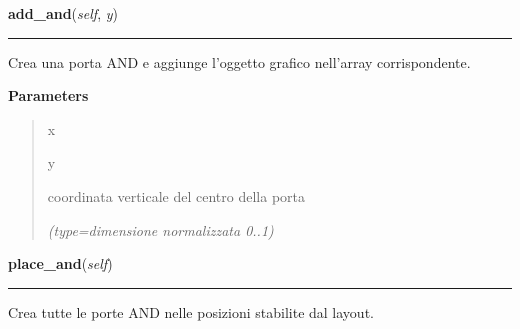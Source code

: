 \hspace{.8\funcindent}\begin{boxedminipage}{\funcwidth}

    \raggedright \textbf{add\_and}(\textit{self}, \textit{y})

    \vspace{-1.5ex}

    \rule{\textwidth}{0.5\fboxrule}
\setlength{\parskip}{2ex}
    Crea una porta AND e aggiunge l'oggetto grafico nell'array 
    corrispondente.

\setlength{\parskip}{1ex}
      \textbf{Parameters}
      \vspace{-1ex}

      \begin{quote}
        \begin{Ventry}{x}

          \item[y]

          coordinata verticale del centro della porta

            {\it (type=dimensione normalizzata 0..1)}

        \end{Ventry}

      \end{quote}

    \end{boxedminipage}

    \label{pla:Pla:place_and}

    \vspace{0.5ex}

\hspace{.8\funcindent}\begin{boxedminipage}{\funcwidth}

    \raggedright \textbf{place\_and}(\textit{self})

    \vspace{-1.5ex}

    \rule{\textwidth}{0.5\fboxrule}
\setlength{\parskip}{2ex}
    Crea tutte le porte AND nelle posizioni stabilite dal layout.

\setlength{\parskip}{1ex}
    \end{boxedminipage}

    \label{pla:Pla:add_or}

    \vspace{0.5ex}

